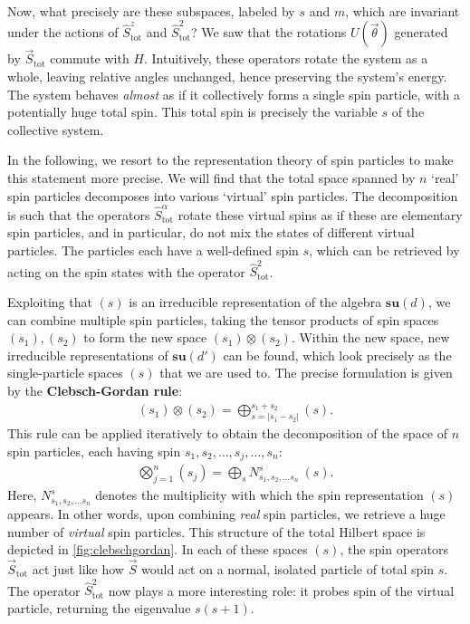 \paragraph{}
Now, what precisely are these subspaces, labeled by $s$ and $m$, which are invariant under the actions of $\hat{S}_\text{tot}^z$ and $\hat{S}_\text{tot}^2$? We saw that the rotations $U(\vec{\theta})$ generated by $\vec{S}_\text{tot}$ commute with $H$. Intuitively, these operators rotate the system as a whole, leaving relative angles unchanged, hence preserving the system's energy. The system behaves \emph{almost} as if it collectively forms a single spin particle, with a potentially huge total spin. This total spin is precisely the variable $s$ of the collective system. 

In the following, we resort to the representation theory of spin particles to make this statement more precise. We will find that the total space spanned by $n$ `real' spin particles decomposes into various `virtual' spin particles. The decomposition is such that the operators $\hat{S}^\alpha_\text{tot}$ rotate these virtual spins as if these are elementary spin particles, and in particular, do not mix the states of different virtual particles. The particles each have a well-defined spin $s$, which can be retrieved by acting on the spin states with the operator $\hat{S}^2_\text{tot}$. 

Exploiting that $(s)$ is an irreducible representation of the algebra $\textbf{su}(d)$, we can combine multiple spin particles, taking the tensor products of spin spaces $(s_1), (s_2)$ to form the new space $(s_1) \otimes (s_2)$. Within the new space, new irreducible representations of $\textbf{su}(d')$ can be found, which look precisely as the single-particle spaces $(s)$ that we are used to. The precise formulation is given by the \textbf{Clebsch-Gordan rule}:
\begin{align}
(s_1) \otimes (s_2) = \bigoplus_{s = |s_1 - s_2|}^{s_1 + s_2} (s).
\label{eqn:intr_clebschgordanrule}
\end{align}
This rule can be applied iteratively to obtain the decomposition of the space of $n$ spin particles, each having spin $s_1, s_2, \ldots, s_j, \ldots, s_n$:
\begin{align}
\bigotimes_{j=1}^n (s_j) = \bigoplus_{s} N_{s_1, s_2, \ldots s_n}^{s} \ (s).
\label{eqn:intr_clebschgordan}
\end{align}
Here, $N^s_{s_1, s_2, \ldots s_n}$ denotes the multiplicity with which the spin representation $(s)$ appears. In other words, upon combining \emph{real} spin particles, we retrieve a huge number of \emph{virtual} spin particles. This structure of the total Hilbert space is depicted in \cref{fig:clebschgordan}. In each of these spaces $(s)$, the spin operators $\vec{S}_\text{tot}$ act just like how $\vec{S}$ would act on a normal, isolated particle of total spin $s$. The operator $\hat{S}_\text{tot}^2$ now plays a more interesting role: it probes spin of the virtual particle, returning the eigenvalue $s(s+1)$. 

